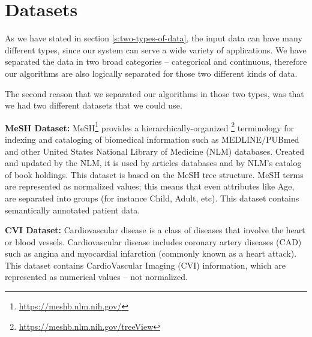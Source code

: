 \section{Datasets}\label{s:datasets}
As we have stated in section \ref{s:two-types-of-data}, the input data can have many different types, since our system can serve a wide variety of applications.
We have separated the data in two broad categories -- categorical and continuous, therefore our algorithms are also logically separated for those two different kinds of data.

The second reason that we separated our algorithms in those two types, was that we had two different datasets that we could use.

\textbf{MeSH Dataset:}
MeSH\footnote{\href{https://meshb.nlm.nih.gov/}{https://meshb.nlm.nih.gov/}} provides a hierarchically-organized \footnote{\href{https://meshb.nlm.nih.gov/treeView}{https://meshb.nlm.nih.gov/treeView}} terminology for indexing and cataloging of biomedical information such as MEDLINE/PUBmed and other United States National Library of Medicine (NLM) databases.
Created and updated by the NLM, it is used by articles databases and by NLM's catalog of book holdings.
This dataset is based on the MeSH tree structure.
MeSH terms are represented as normalized values; this means that even attributes like Age, are separated into groups (for instance Child, Adult, etc).
This dataset contains semantically annotated patient data.

\textbf{CVI Dataset:}
Cardiovascular disease is a class of diseases that involve the heart or blood vessels.
Cardiovascular disease includes coronary artery diseases (CAD) such as angina and myocardial infarction (commonly known as a heart attack).
This dataset contains CardioVascular Imaging (CVI) information, which are represented as numerical values – not normalized.


